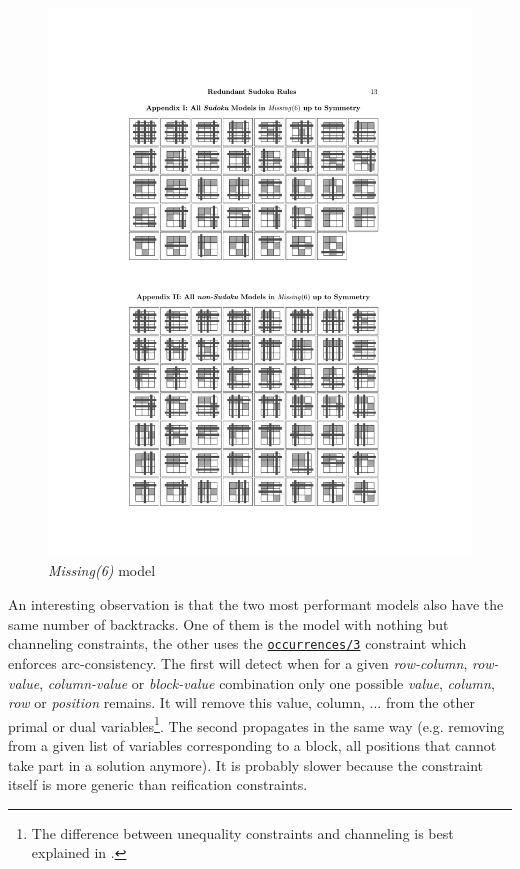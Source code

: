 \begin{figure}[H]
\centering
\includegraphics{misc/missing6}
\caption{\textit{Missing(6)} model}
\label{fig:missing6}
\end{figure}

An interesting observation is that the two most performant models also have the same number of backtracks. One of them is the model with nothing but channeling constraints, the other uses the \href{http://eclipseclp.org/doc/bips/lib/ic_global/occurrences-3.html}{\texttt{occurrences/3}} constraint which enforces arc-consistency. The first will detect when for a given \textit{row-column}, \textit{row-value}, \textit{column-value} or \textit{block-value} combination only one possible \textit{value}, \textit{column}, \textit{row} or \textit{position} remains. It will remove this value, column, ... from the other primal or dual variables\footnote{The difference between unequality constraints and channeling is best explained in \cite{article:channeling}.}. The second propagates in the same way (e.g. removing from a given list of variables corresponding to a block, all positions that cannot take part in a solution anymore). It is probably slower because the constraint itself is more generic than reification constraints.\\\par

